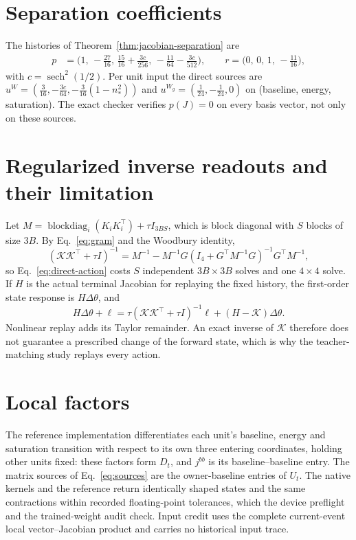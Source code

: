 \documentclass[11pt]{article}
\theoremstyle{definition}
\newcommand{\bdiag}{\operatorname{blockdiag}}
\newcommand{\sech}{\operatorname{sech}}
\begin{document}
\section{Separation coefficients}
\label{app:separation}
The histories of Theorem~\ref{thm:jacobian-separation} are
\begin{align*}
 p&=\big(1,\,-\tfrac{27}{16},\,\tfrac{15}{16}+\tfrac{3c}{256},\,-\tfrac{11}{64}-\tfrac{3c}{512}\big),\qquad
 r=\big(0,\,0,\,1,\,-\tfrac{11}{16}\big),
\end{align*}
with $c=\sech^2(1/2)$. Per unit input the direct sources are
$u^W=(\tfrac{3}{16},-\tfrac{3c}{64},-\tfrac{3}{16}(1-n_*^2))$ and
$u^{W_g}=(\tfrac{1}{24},-\tfrac{1}{24},0)$ on (baseline, energy, saturation). The
exact checker verifies $p(J)=0$ on every basis vector, not only on these sources.

\section{Regularized inverse readouts and their limitation}
\label{app:inverse}

Let $M=\bdiag_i(K_iK_i^\top)+\tau I_{3BS}$, which is block diagonal with $S$ blocks of
size $3B$. By Eq.~\eqref{eq:gram} and the Woodbury identity,
\begin{equation}
 (\mathcal K\mathcal K^\top+\tau I)^{-1}
 =M^{-1}-M^{-1}G(I_4+G^\top M^{-1}G)^{-1}G^\top M^{-1},
\end{equation}
so Eq.~\eqref{eq:direct-action} costs $S$ independent $3B\times3B$ solves and one
$4\times4$ solve. If $H$ is the actual terminal Jacobian for replaying the fixed
history, the first-order state response is $H\Delta\theta$, and
\begin{equation}
 H\Delta\theta+\ell
 =\tau(\mathcal K\mathcal K^\top+\tau I)^{-1}\ell+(H-\mathcal K)\Delta\theta.
\end{equation}
Nonlinear replay adds its Taylor remainder. An exact inverse of $\mathcal K$
therefore does not guarantee a prescribed change of the forward state, which is
why the teacher-matching study replays every action.

\section{Local factors}
\label{app:local}
The reference implementation differentiates each unit's baseline, energy and
saturation transition with respect to its own three entering coordinates, holding
other units fixed: these factors form $D_t$, and $j^{bb}$ is its baseline--baseline
entry. The matrix sources of Eq.~\eqref{eq:sources} are the owner-baseline entries
of $U_t$. The native kernels and the reference return identically shaped states and
the same contractions within recorded floating-point tolerances, which the device
preflight and the trained-weight audit check. Input credit uses the complete
current-event local vector--Jacobian product and carries no historical input trace.
\end{document}
